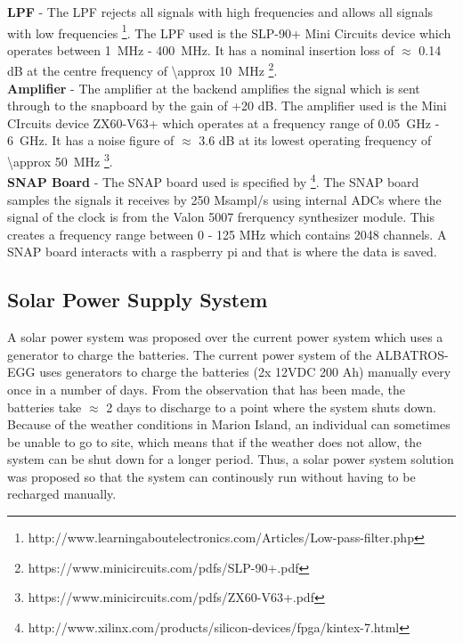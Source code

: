 \documentclass[12pt,a4paper]{report}
\begin{document}
	\textbf{LPF} - The LPF rejects all signals with high frequencies and allows all signals with low frequencies \footnote{http://www.learningaboutelectronics.com/Articles/Low-pass-filter.php}. The LPF used is the SLP-90+ Mini Circuits device which operates between \SI{1}{MHz} - \SI{400}{MHz}. It has a nominal insertion loss of $\approx$ 0.14 dB at the centre frequency of  \SI{\approx 10}{MHz} \footnote{https://www.minicircuits.com/pdfs/SLP-90+.pdf}.\\
	
	\textbf{Amplifier} - The amplifier at the backend amplifies the signal which is sent through to the snapboard by the gain of +20 dB. The amplifier used is the Mini CIrcuits device ZX60-V63+ which operates at a frequency range of \SI{0.05}{GHz} - \SI{6}{GHz}. It has a noise figure of $\approx$ 3.6 dB at its lowest operating frequency of \SI{\approx 50}{MHz} \footnote{https://www.minicircuits.com/pdfs/ZX60-V63+.pdf}.\\
	
	\textbf{SNAP Board} - The SNAP board used is specified by \footnote{http://www.xilinx.com/products/silicon-devices/fpga/kintex-7.html}. The  SNAP board samples the signals it receives by 250 Msampl/s using internal ADCs where the signal of the clock is from the Valon 5007 frerquency synthesizer module. This creates a frequency range between 0 - 125 MHz which contains 2048 channels. A SNAP board interacts with a raspberry pi and that is where the data is saved.\\

	\subsection{Solar Power Supply System}
	
	A solar power system was proposed over the current power system which uses a generator to charge the batteries. The current power system of the ALBATROS-EGG uses generators to charge the batteries (2x 12VDC 200 Ah) manually every once in a number of days. From the observation that has been made, the batteries take $\approx$ 2 days to discharge to a point where the system shuts down. Because of the weather conditions in Marion Island, an individual can sometimes be unable to go to site, which means that if the weather does not allow, the system can be shut down for a longer period. Thus, a solar power system solution was proposed so that the system can continously run without having to be recharged manually.\\
	
\end{document}
